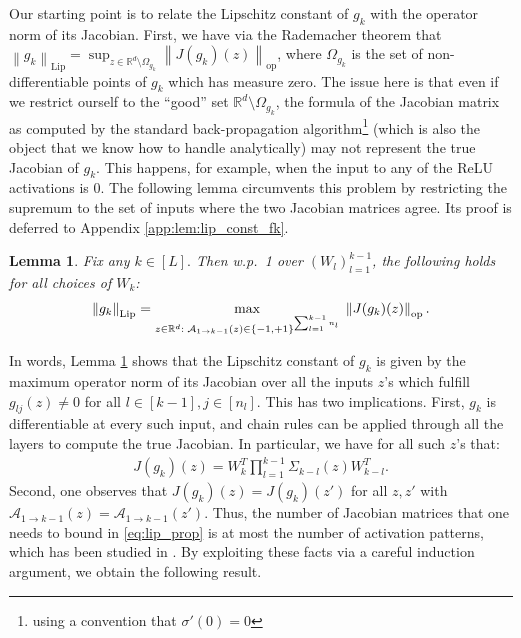 \documentclass[11pt]{article}
\def\RR{\mathbb{R}}
\def\diag{\operatorname{\mathop{diag}}}
\def\Set#1{\left\{ #1 \right\}}
\newtheorem{lemma}[theorem]{Lemma}
\newcommand{\norm}[1]{\left\|#1\right\|}
\def\Lip{\mathrm{Lip}}
\def\op{\mathrm{op}}
\def\max{\mathop{\rm max}\nolimits}
\begin{document}
Our starting point is to relate the Lipschitz constant of $g_k$ with the operator norm of its Jacobian.
First, we have via the Rademacher theorem that $\norm{g_k}_{\Lip}=\sup_{z\in\RR^d\setminus\Omega_{g_k}}\norm{J(g_k)(z)}_{\op}$,
where $\Omega_{g_k}$ is the set of non-differentiable points of $g_k$ which has measure zero.
The issue here is that even if we restrict ourself to the ``good'' set $\RR^d\setminus\Omega_{g_k}$,
the formula of the Jacobian matrix as computed by the standard back-propagation algorithm\footnote{using a convention that $\sigma'(0)=0$} (which is also the object that we know how to handle analytically) may not represent the true Jacobian of $g_k.$
This happens, for example, when the input to any of the ReLU activations is $0$. 
The following lemma circumvents this problem by restricting the supremum to the set of inputs where the two Jacobian matrices agree. 
Its proof is deferred to Appendix \ref{app:lem:lip_const_fk}.
\begin{lemma}\label{lem:lip_const_fk}
    Fix any $k\in[L].$ 
    Then w.p.\ 1 over $(W_l)_{l=1}^{k-1}$, the following holds for all choices of $W_k$:
    \begin{align}\label{eq:lip_prop}
	\norm{g_k}_{\Lip} 
	= \max\limits_{z\in\RR^d:\; \mathcal{A}_{1\to k-1}(z)\in\Set{-1,+1}^{\sum_{l=1}^{k-1}n_l}}\; \norm{J(g_k)(z)}_{\op}.
    \end{align}
\end{lemma}
In words, Lemma \ref{lem:lip_const_fk} shows that the Lipschitz constant of $g_k$
is given by the maximum operator norm of its Jacobian over all the inputs $z$'s which fulfill $g_{lj}(z)\neq 0$ for all $l\in[k-1],j\in[n_l].$
This has two implications. First, $g_k$ is differentiable at every such input, 
and chain rules can be applied through all the layers to compute the true Jacobian.
In particular, we have for all such $z$'s that:
\begin{align}\label{eq:Jab_form}
    J(g_k)(z)=W_k^T\prod_{l=1}^{k-1}\Sigma_{k-l}(z) W_{k-l}^T.%
\end{align}
Second, one observes that $J(g_k)(z)=J(g_k)(z')$ for all $z,z'$ with $\mathcal{A}_{1\to k-1}(z)=\mathcal{A}_{1\to k-1}(z').$
Thus, the number of Jacobian matrices that one needs to bound in \eqref{eq:lip_prop}
is at most the number of activation patterns, which has been studied in \citep{HaninRolnick2019,MontufarEtal2014,SerraEtal2018}.
By exploiting these facts via a careful induction argument, we obtain the following result.
\end{document}
